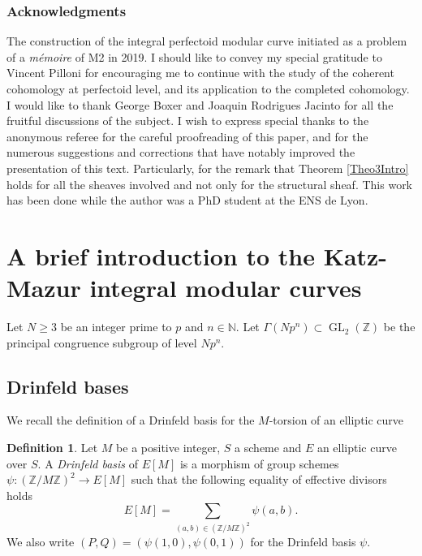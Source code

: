 \documentclass[11pt]{article}
\numberwithin{equation}{section}
\theoremstyle{definition}
\newtheorem{definition}[prop]{Definition}
\newcommand{\bb}[1]{\mathbb{#1}}
\DeclareMathOperator{\GL}{GL}
\begin{document}
\subsubsection*{Acknowledgments} The construction of the integral perfectoid modular curve initiated as a problem of a \textit{mémoire} of M2 in 2019. I should like to convey my special gratitude to Vincent Pilloni for encouraging me to continue with the study of the coherent cohomology at perfectoid level, and its application to the completed cohomology. I would like to thank George Boxer and Joaquin Rodrigues Jacinto for all the fruitful discussions of the subject. I wish to express special thanks to the anonymous referee for the careful proofreading of this paper, and for the numerous suggestions and corrections that have notably improved the presentation of this text. Particularly, for the remark that Theorem \ref{Theo3Intro} holds for all the sheaves involved and not only for the structural sheaf. This work has been done while the author was a PhD student at the ENS de Lyon.

\section{A brief introduction to the Katz-Mazur integral modular curves}

\label{RecallsModularCurves}

Let $N\geq 3$ be an integer prime to $p$ and $n\in \bb{N}$. Let $\Gamma(Np^n)\subset \GL_2(\bb{Z})$ be the principal congruence subgroup of level $Np^n$.
\subsection*{Drinfeld bases}

We recall the definition of a Drinfeld basis for the $M$-torsion of an elliptic curve

\begin{definition}
Let $M$ be a positive integer, $S$ a scheme and $E$ an elliptic curve over $S$. A \textit{Drinfeld basis} of $E[M]$ is a morphism of group schemes $ \psi:(\bb{Z}/M\bb{Z})^2\to E[M] $ such that the following equality of effective divisors holds
\begin{equation}
\label{eqDrinfeldbasis}
E[M]=\sum_{(a,b)\in (\bb{Z}/M\bb{Z})^2} \psi(a,b).
\end{equation}
We also write $(P,Q)=(\psi(1,0), \psi(0,1))$ for the Drinfeld basis $\psi$.
\end{definition}
\end{document}
